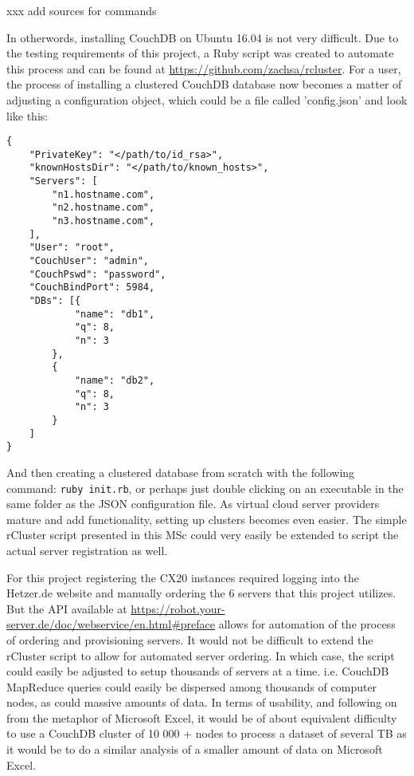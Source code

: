 xxx add sources for commands

In otherwords, installing CouchDB on Ubuntu 16.04 is not very difficult. Due to the testing requirements of this project, a Ruby script was created to automate this process and can be found at \url{https://github.com/zachsa/rcluster}. For a user, the process of installing a clustered CouchDB database now becomes a matter of adjusting a configuration object, which could be a file called 'config.json' and look like this:

\begin{verbatim}
{
    "PrivateKey": "</path/to/id_rsa>",
    "knownHostsDir": "</path/to/known_hosts>",
    "Servers": [
        "n1.hostname.com",
        "n2.hostname.com",
        "n3.hostname.com",
    ],
    "User": "root",
    "CouchUser": "admin",
    "CouchPswd": "password",
    "CouchBindPort": 5984,
    "DBs": [{
            "name": "db1",
            "q": 8,
            "n": 3
        },
        {
            "name": "db2",
            "q": 8,
            "n": 3
        }
    ]
}
\end{verbatim}

And then creating a clustered database from scratch with the following command: \texttt{ruby init.rb}, or perhaps just double clicking on an executable in the same folder as the JSON configuration file. As virtual cloud server providers mature and add functionality, setting up clusters becomes even easier. The simple rCluster script presented in this MSc could very easily be extended to script the actual server registration as well.

For this project registering the CX20 instances required logging into the Hetzer.de website and manually ordering the 6 servers that this project utilizes. But the API available at \url{https://robot.your-server.de/doc/webservice/en.html#preface} allows for automation of the process of ordering and provisioning servers. It would not be difficult to extend the rCluster script to allow for automated server ordering. In which case, the script could easily be adjusted to setup thousands of servers at a time. i.e. CouchDB MapReduce queries could easily be dispersed among thousands of computer nodes, as could massive amounts of data. In terms of usability, and following on from the metaphor of Microsoft Excel, it would be of about equivalent difficulty to use a CouchDB cluster of 10 000 + nodes to process a dataset of several TB as it would be to do a similar analysis of a smaller amount of data on Microsoft Excel.

